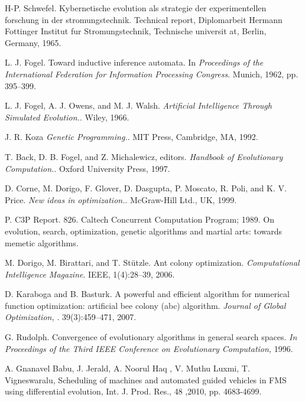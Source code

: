 \begin{thebibliography}{9}
     H-P. Schwefel.
    Kybernetische evolution als strategie der experimentellen forschung in der stromungstechnik. 
    Technical report, Diplomarbeit Hermann Fottinger Institut fur Stromungstechnik, Technische universit at, Berlin, Germany, 1965.

    L. J. Fogel. Toward inductive inference automata. In
    \textit{Proceedings of the International Federation for Information Processing Congress}. 
     Munich, 1962, pp. 395–399.

    L. J. Fogel, A. J. Owens, and M. J. Walsh.
    \textit{Artificial Intelligence Through Simulated Evolution.}. 
    Wiley, 1966.

    J. R. Koza
    \textit{Genetic Programming.}. 
    MIT Press, Cambridge, MA, 1992.

    T. Back, D. B. Fogel, and Z. Michalewicz, editors.
    \textit{Handbook of Evolutionary Computation.}. 
    Oxford University Press, 1997.
    
    D. Corne, M. Dorigo, F. Glover, D. Dasgupta, P. Moscato, R. Poli, and K. V. Price.
    \textit{New ideas in optimization.}. 
    McGraw-Hill Ltd., UK, 1999.
    
     P. C3P Report. 826. Caltech Concurrent Computation Program; 1989. On evolution, search, optimization, genetic algorithms and martial arts: towards memetic algorithms.  
    
    M. Dorigo, M. Birattari, and T. Stützle. Ant colony optimization.
    \textit{Computational Intelligence Magazine}. 
    IEEE, 1(4):28–39, 2006.

    D. Karaboga and B. Basturk. A powerful and efficient algorithm for numerical function optimization: artificial bee colony (abc) algorithm. 
    \textit{Journal of Global Optimization, }. 
    39(3):459–471, 2007.
    
    G. Rudolph. Convergence of evolutionary algorithms in general search spaces.
    \textit{In Proceedings of the Third IEEE Conference on Evolutionary Computation,}
    1996.
    
    A. Gnanavel Babu, J. Jerald, A. Noorul Haq , V. Muthu Luxmi, T. Vigneswaralu, Scheduling of machines and automated guided vehicles in FMS using differential evolution, Int. J. Prod. Res., 48 ,2010, pp. 4683-4699.
    

\end{thebibliography}
